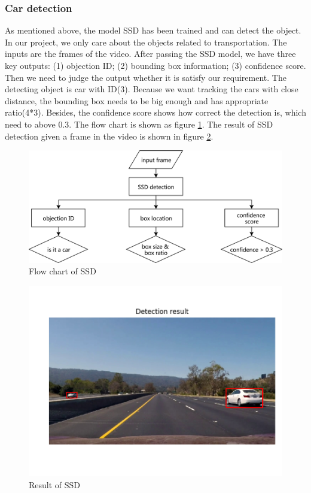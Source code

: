 \documentclass[10pt,twocolumn,letterpaper]{article}
\begin{document}
\subsubsection{Car detection}
As mentioned above, the model SSD has been trained and can detect the object. In our project, we only care about the objects related to transportation. The inputs are the frames of the video. After passing the SSD model, we have three key outputs: (1) objection ID; (2) bounding box information; (3) confidence score. Then we need to judge the output whether it is satisfy our requirement. The detecting object is car with ID(3). Because we want tracking the cars with close distance, the bounding box needs to be big enough and has appropriate ratio(4*3). Besides, the confidence score shows how correct the detection is, which need to above 0.3. The flow chart is shown as figure \ref{fig:2_1_2}. The result of SSD detection given a frame in the video is shown in figure \ref{fig:2_1_3}.

\begin{figure}[!h]
\begin{center}
   \includegraphics[width=0.9\linewidth]{ssd_chart}
\end{center}
   \caption{Flow chart of SSD}
\label{fig:2_1_2}
\end{figure}

\begin{figure}[t]
\begin{center}
   \includegraphics[width=0.9\linewidth]{ssd_consequence}
\end{center}
   \caption{Result of SSD}
\label{fig:2_1_3}
\end{figure}
\end{document}
